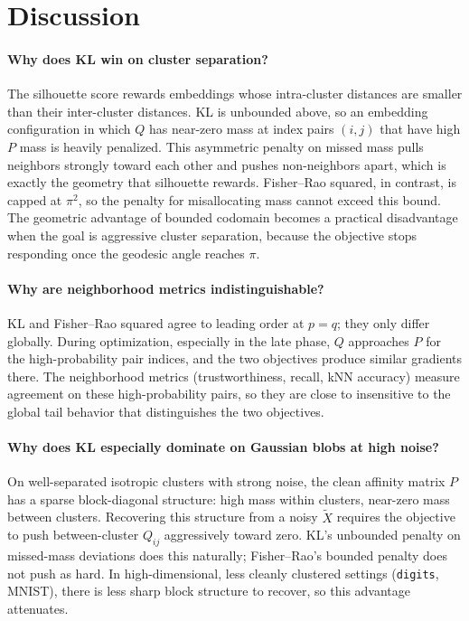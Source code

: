 \documentclass[11pt]{article}
\begin{document}
\section{Discussion}
\label{sec:discussion}

\paragraph{Why does KL win on cluster separation?}
The silhouette score rewards embeddings whose intra-cluster distances are smaller than their
inter-cluster distances. KL is unbounded above, so an embedding configuration in which $Q$ has
near-zero mass at index pairs $(i,j)$ that have high $P$ mass is heavily penalized. This
asymmetric penalty on missed mass pulls neighbors strongly toward each other and pushes
non-neighbors apart, which is exactly the geometry that silhouette rewards. Fisher--Rao
squared, in contrast, is capped at $\pi^2$, so the penalty for misallocating mass cannot exceed
this bound. The geometric advantage of bounded codomain becomes a practical disadvantage when
the goal is aggressive cluster separation, because the objective stops responding once the
geodesic angle reaches $\pi$.

\paragraph{Why are neighborhood metrics indistinguishable?}
KL and Fisher--Rao squared agree to leading order at $p=q$; they only differ globally. During
optimization, especially in the late phase, $Q$ approaches $P$ for the high-probability pair
indices, and the two objectives produce similar gradients there. The neighborhood metrics
(trustworthiness, recall, kNN accuracy) measure agreement on these high-probability pairs, so
they are close to insensitive to the global tail behavior that distinguishes the two
objectives.

\paragraph{Why does KL especially dominate on Gaussian blobs at high noise?}
On well-separated isotropic clusters with strong noise, the clean affinity matrix $P$ has a
sparse block-diagonal structure: high mass within clusters, near-zero mass between clusters.
Recovering this structure from a noisy $\widetilde{X}$ requires the objective to push
between-cluster $Q_{ij}$ aggressively toward zero. KL's unbounded penalty on missed-mass
deviations does this naturally; Fisher--Rao's bounded penalty does not push as hard. In
high-dimensional, less cleanly clustered settings (\texttt{digits}, MNIST), there is less
sharp block structure to recover, so this advantage attenuates.
\end{document}
